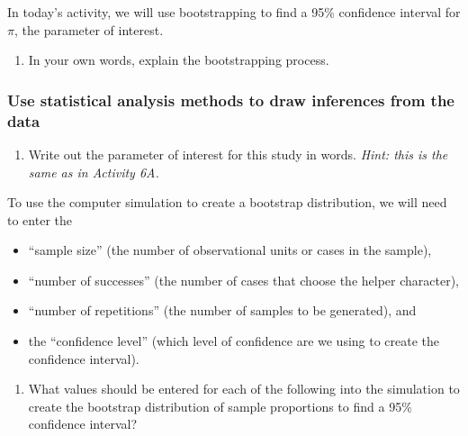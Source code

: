 \documentclass[
]{report}
\providecommand{\tightlist}{%
  \setlength{\itemsep}{0pt}\setlength{\parskip}{0pt}}
\begin{document}
\vspace{0.5in}

In today's activity, we will use bootstrapping to find a 95\% confidence interval for \(\pi\), the parameter of interest.

\begin{enumerate}
\def\labelenumi{\arabic{enumi}.}
\setcounter{enumi}{2}
\tightlist
\item
  In your own words, explain the bootstrapping process.
  \vspace{0.5in}
\end{enumerate}

\hypertarget{use-statistical-analysis-methods-to-draw-inferences-from-the-data-1}{%
\subsubsection*{Use statistical analysis methods to draw inferences from the data}\label{use-statistical-analysis-methods-to-draw-inferences-from-the-data-1}}

\begin{enumerate}
\def\labelenumi{\arabic{enumi}.}
\setcounter{enumi}{3}
\tightlist
\item
  Write out the parameter of interest for this study in words. \emph{Hint: this is the same as in Activity 6A.}
\end{enumerate}

\vspace{0.5in}

To use the computer simulation to create a bootstrap distribution, we will need to enter the

\begin{itemize}
\tightlist
\item
  ``sample size'' (the number of observational units or cases in the sample),
\item
  ``number of successes'' (the number of cases that choose the helper character),
\item
  ``number of repetitions'' (the number of samples to be generated), and
\item
  the ``confidence level'' (which level of confidence are we using to create the confidence interval).
\end{itemize}

\begin{enumerate}
\def\labelenumi{\arabic{enumi}.}
\setcounter{enumi}{4}
\tightlist
\item
  What values should be entered for each of the following into the simulation to create the bootstrap distribution of sample proportions to find a 95\% confidence interval?
  \vspace{1mm}
\end{enumerate}
\end{document}
